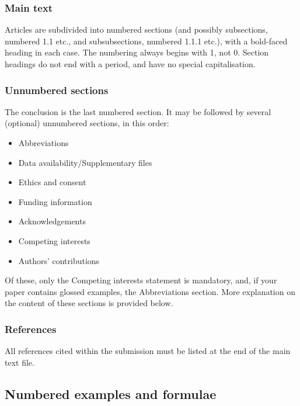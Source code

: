 \documentclass[cm,linguex]{glossa}
\begin{document}
\hypertarget{main-text}{%
\subsubsection{Main text}\label{main-text}}

Articles are subdivided into numbered sections (and possibly
subsections, numbered 1.1 etc., and subsubsections, numbered 1.1.1
etc.), with a bold-faced heading in each case. The numbering always
begins with 1, not 0. Section headings do not end with a period, and
have no special capitalisation.

\hypertarget{unnumbered-sections}{%
\subsubsection{Unnumbered sections}\label{unnumbered-sections}}

The conclusion is the last numbered section. It may be followed by
several (optional) unnumbered sections, in this order:

\begin{itemize}
\item
  Abbreviations
\item
  Data availability/Supplementary files
\item
  Ethics and consent
\item
  Funding information
\item
  Acknowledgements
\item
  Competing interests
\item
  Authors' contributions
\end{itemize}

Of these, only the Competing interests statement is mandatory, and, if
your paper contains glossed examples, the Abbreviations section. More
explanation on the content of these sections is provided below.

\hypertarget{references}{%
\subsubsection{References}\label{references}}

All references cited within the submission must be listed at the end of
the main text file.

\hypertarget{numbered-examples-and-formulae}{%
\subsection{Numbered examples and
formulae}\label{numbered-examples-and-formulae}}
\end{document}
